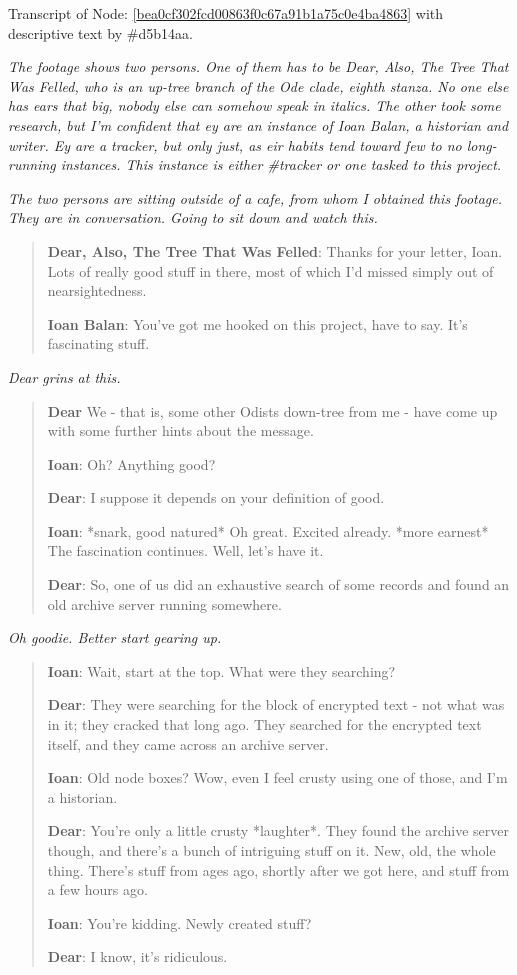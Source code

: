 Transcript of Node: \href{http://35.165.134.227/node/bea0cf302fcd00863f0c67a91b1a75c0e4ba4863}{{[}bea0cf302fcd00863f0c67a91b1a75c0e4ba4863{]}} with descriptive text by \#d5b14aa.

\emph{The footage shows two persons. One of them has to be Dear, Also, The Tree That Was Felled, who is an up-tree branch of the Ode clade, eighth stanza. No one else has ears that big, nobody else can somehow speak in italics. The other took some research, but I'm confident that ey are an instance of Ioan Balan, a historian and writer. Ey are a tracker, but only just, as eir habits tend toward few to no long-running instances. This instance is either \#tracker or one tasked to this project.}

\emph{The two persons are sitting outside of a cafe, from whom I obtained this footage. They are in conversation. Going to sit down and watch this.}

\begin{quote}
\textbf{Dear, Also, The Tree That Was Felled}: Thanks for your letter, Ioan. Lots of really good stuff in there, most of which I'd missed simply out of nearsightedness.

\textbf{Ioan Balan}: You've got me hooked on this project, have to say. It's fascinating stuff.
\end{quote}

\emph{Dear grins at this.}

\begin{quote}
\textbf{Dear} We - that is, some other Odists down-tree from me - have come up with some further hints about the message.

\textbf{Ioan}: Oh? Anything good?

\textbf{Dear}: I suppose it depends on your definition of good.

\textbf{Ioan}: *snark, good natured* Oh great. Excited already. *more earnest* The fascination continues. Well, let's have it.

\textbf{Dear}: So, one of us did an exhaustive search of some records and found an old archive server running somewhere.
\end{quote}

\emph{Oh goodie. Better start gearing up.}

\begin{quote}
\textbf{Ioan}: Wait, start at the top. What were they searching?

\textbf{Dear}: They were searching for the block of encrypted text - not what was in it; they cracked that long ago. They searched for the encrypted text itself, and they came across an archive server.

\textbf{Ioan}: Old node boxes? Wow, even I feel crusty using one of those, and I'm a historian.

\textbf{Dear}: You're only a little crusty *laughter*. They found the archive server though, and there's a bunch of intriguing stuff on it. New, old, the whole thing. There's stuff from ages ago, shortly after we got here, and stuff from a few hours ago.

\textbf{Ioan}: You're kidding. Newly created stuff?

\textbf{Dear}: I know, it's ridiculous.
\end{quote}

